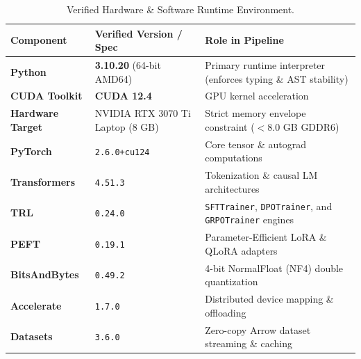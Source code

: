 \documentclass[12pt, a4paper]{article}
\begin{document}
\begin{table}[H]
\centering
\small
\caption{Verified Hardware \& Software Runtime Environment.}
\label{tab:env_specs}
\begin{tabularx}{\textwidth}{l p{4.2cm} X}
\toprule
\textbf{Component} & \textbf{Verified Version / Spec} & \textbf{Role in Pipeline} \\
\midrule
\textbf{Python} & \textbf{3.10.20} (64-bit AMD64) & Primary runtime interpreter (enforces typing \& AST stability) \\
\textbf{CUDA Toolkit} & \textbf{CUDA 12.4} & GPU kernel acceleration \\
\textbf{Hardware Target} & NVIDIA RTX 3070 Ti Laptop (8 GB) & Strict memory envelope constraint ($<8.0$ GB GDDR6) \\
\textbf{PyTorch} & \texttt{2.6.0+cu124} & Core tensor \& autograd computations \\
\textbf{Transformers} & \texttt{4.51.3} & Tokenization \& causal LM architectures \\
\textbf{TRL} & \texttt{0.24.0} & \texttt{SFTTrainer}, \texttt{DPOTrainer}, and \texttt{GRPOTrainer} engines \\
\textbf{PEFT} & \texttt{0.19.1} & Parameter-Efficient LoRA \& QLoRA adapters \\
\textbf{BitsAndBytes} & \texttt{0.49.2} & 4-bit NormalFloat (NF4) double quantization \\
\textbf{Accelerate} & \texttt{1.7.0} & Distributed device mapping \& offloading \\
\textbf{Datasets} & \texttt{3.6.0} & Zero-copy Arrow dataset streaming \& caching \\
\bottomrule
\end{tabularx}
\end{table}
\end{document}
